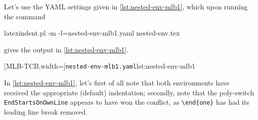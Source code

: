 
        Let's use the YAML settings given in \cref{lst:nested-env-mlb1}, which upon running the command
        \begin{commandshell}
latexindent.pl -m -l=nested-env-mlb1.yaml nested-env.tex
        \end{commandshell}
        gives the output in \cref{lst:nested-env-mlb1}.

	\begin{minipage}{.45\linewidth}
	\end{minipage}
    \hfill
	\begin{minipage}{.55\linewidth}
		[MLB-TCB,width=\linewidth]{\texttt{nested-env-mlb1.yaml}}{lst:nested-env-mlb1}
	\end{minipage}

    In \cref{lst:nested-env-mlb1}, let's first of all note that both environments have received the appropriate (default) indentation; secondly, 
    note that the poly-switch \texttt{EndStartsOnOwnLine} appears to have won the conflict, as \lstinline!\end{one}! has had its leading line break removed.


